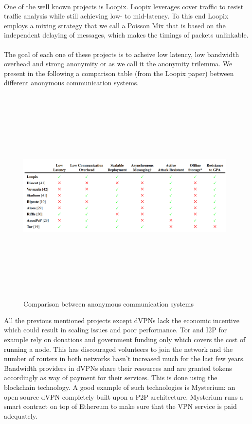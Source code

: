 \\ One of the well known projects is Loopix. Loopix leverages cover traffic to resist traffic analysis while still achieving low- to mid-latency. To this end Loopix employs a mixing strategy that we call a Poisson Mix that is based on the independent delaying of messages, which makes the timings of packets unlinkable.
\\~\\ The goal of each one of these projects is to acheive low latency, low bandwidth overhead and strong anonymity or as we call it the anonymity trilemma. We present in the following a comparison table (from the Loopix paper) between different anonymous communication systems.

\begin{figure}[H]
    \centering
    \includegraphics[width=11cm,height=11cm,keepaspectratio]{../whitepaper/images/state-of-the-art.png}
    \caption{Comparison between anonymous communication systems}
    \label{fig:Comparison between anonymous communication systems}
\end{figure}
\hspace{-5mm}All the previous mentioned projects except dVPNs lack the economic incentive which could result in scaling issues and poor performance. Tor and I2P for example rely on donations and government funding only which covers the cost of running a node. This has discouraged volunteers to join the network and the number of routers in both networks hasn't increased much for the last few years. Bandwidth providers in dVPNs share their resources and are granted tokens accordingly as way of payment for their services. This is done using the blockchain technology. A good example of such technologies is Mysterium: an open source dVPN completely built upon a P2P architecture. Mysterium runs a smart contract on top of Ethereum to make sure that the VPN service is paid adequately.

